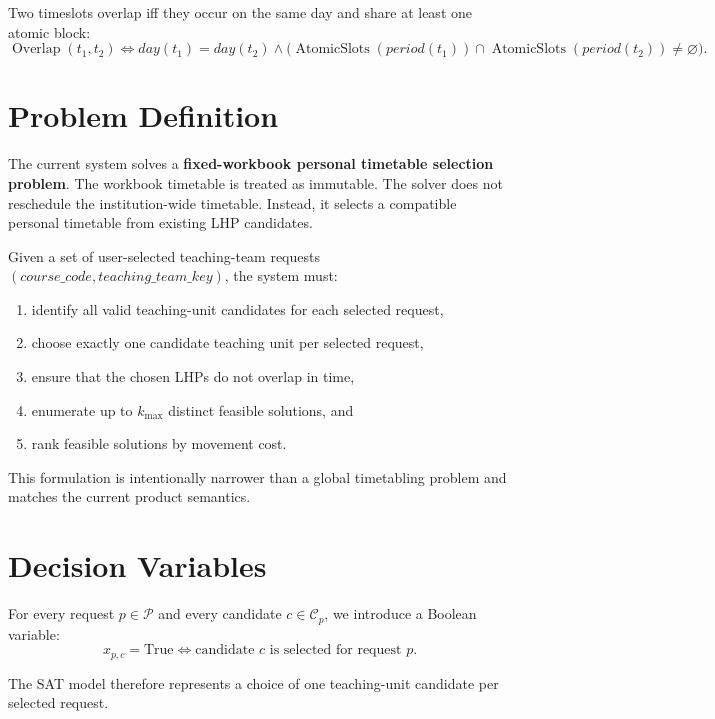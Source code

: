 \documentclass{article}
\newcommand{\Overlap}{\operatorname{Overlap}}
\newcommand{\Atomic}{\operatorname{AtomicSlots}}
\begin{document}
Two timeslots overlap iff they occur on the same day and share at least one atomic block:
\begin{equation}
\Overlap(t_1, t_2) \iff day(t_1) = day(t_2) \wedge \bigl(\Atomic(period(t_1)) \cap \Atomic(period(t_2)) \neq \varnothing\bigr).
\label{eq:overlap}
\end{equation}

\section{Problem Definition}

The current system solves a \textbf{fixed-workbook personal timetable selection problem}. The workbook timetable is treated as immutable. The solver does not reschedule the institution-wide timetable. Instead, it selects a compatible personal timetable from existing LHP candidates.

Given a set of user-selected teaching-team requests $(course\_code, teaching\_team\_key)$, the system must:
\begin{enumerate}
    \item identify all valid teaching-unit candidates for each selected request,
    \item choose exactly one candidate teaching unit per selected request,
    \item ensure that the chosen LHPs do not overlap in time,
    \item enumerate up to $k_{\max}$ distinct feasible solutions, and
    \item rank feasible solutions by movement cost.
\end{enumerate}

This formulation is intentionally narrower than a global timetabling problem and matches the current product semantics.

\section{Decision Variables}

For every request $p \in \mathcal{P}$ and every candidate $c \in \mathcal{C}_p$, we introduce a Boolean variable:
\begin{equation}
x_{p,c} = \text{True} \iff \text{candidate } c \text{ is selected for request } p.
\label{eq:decision_var}
\end{equation}

The SAT model therefore represents a choice of one teaching-unit candidate per selected request.
\end{document}
